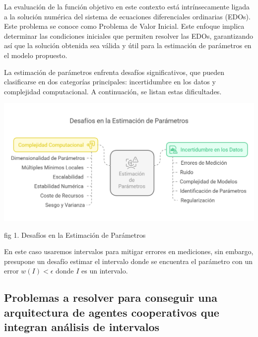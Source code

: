     La evaluación de la función objetivo en este contexto está intrínsecamente ligada a la solución numérica del sistema de ecuaciones diferenciales ordinarias (EDOs). Este problema se conoce como Problema de Valor Inicial. Este enfoque implica determinar las condiciones iniciales que permiten resolver las EDOs, garantizando así que la solución obtenida sea válida y útil para la estimación de parámetros en el modelo propuesto.

        La estimación de parámetros enfrenta desafíos significativos, que pueden clasificarse en dos categorías principales: incertidumbre en los datos y complejidad computacional. A continuación, se listan estas dificultades. \\


        \begin{center}
            \includegraphics[width=1\textwidth]{images/visual-selection.png}
            \begin{center}
                fig 1. Desafíos en la Estimación de Parámetros
            \end{center}
    \end{center}

        En este caso usaremos intervalos para mitigar errores en mediciones, sin embargo, presupone un desafío estimar el intervalo donde se encuentra el parámetro con un error $w(I) < \epsilon$  donde $I$ es un intervalo.\\



        \subsection*{ Problemas a resolver para conseguir una arquitectura de agentes cooperativos que integran análisis de intervalos }

